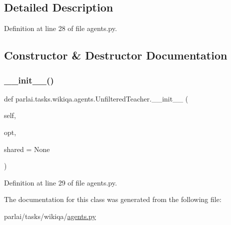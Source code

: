 \subsection{Detailed Description}


Definition at line 28 of file agents.\+py.



\subsection{Constructor \& Destructor Documentation}
\mbox{\label{classparlai_1_1tasks_1_1wikiqa_1_1agents_1_1UnfilteredTeacher_a3f69b4069d4702ca92b2ce728f0e4ca4}} 
\subsubsection{\texorpdfstring{\+\_\+\+\_\+init\+\_\+\+\_\+()}{\_\_init\_\_()}}
{\footnotesize\ttfamily def parlai.\+tasks.\+wikiqa.\+agents.\+Unfiltered\+Teacher.\+\_\+\+\_\+init\+\_\+\+\_\+ (\begin{DoxyParamCaption}\item[{}]{self,  }\item[{}]{opt,  }\item[{}]{shared = {\ttfamily None} }\end{DoxyParamCaption})}



Definition at line 29 of file agents.\+py.



The documentation for this class was generated from the following file\+:\begin{DoxyCompactItemize}
\item 
parlai/tasks/wikiqa/\hyperlink{parlai_2tasks_2wikiqa_2agents_8py}{agents.\+py}\end{DoxyCompactItemize}
